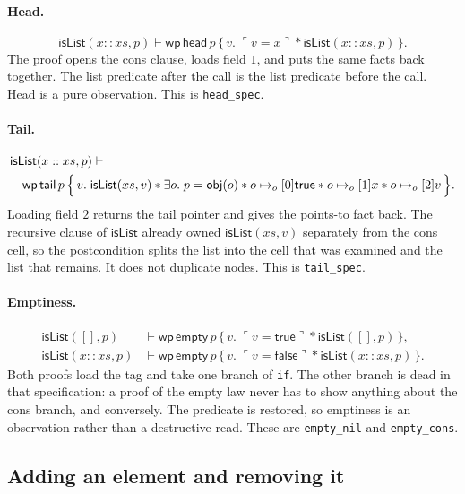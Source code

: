 \documentclass[11pt]{article}
\newcommand{\True}{\mathsf{true}}
\newcommand{\False}{\mathsf{false}}
\newcommand{\ptso}{\mathrel{\mapsto_{o}}}
\newcommand{\sep}{\mathbin{*}}
\newcommand{\Wpre}{\mathsf{wp}}
\newcommand{\pure}[1]{\ulcorner #1 \urcorner}
\begin{document}
\paragraph{Head.}
\[
\mathsf{isList}(x :: xs, p)
\vdash
\Wpre\,\mathsf{head}\,p
\,\{\,v.\; \pure{v = x} \sep \mathsf{isList}(x :: xs, p)\,\}.
\]
The proof opens the cons clause, loads field \(1\), and puts the same facts back together.
The list predicate after the call is the list predicate before the call.
Head is a pure observation.
This is \texttt{head\_spec}.

\paragraph{Tail.}
\[
\begin{aligned}
&\mathsf{isList}(x :: xs, p) \vdash {}\\
&\quad\Wpre\,\mathsf{tail}\,p
\,\Bigl\{\,v.\;
  \mathsf{isList}(xs, v)
  \sep
  \exists o.\;
  p = \mathsf{obj}(o)
  \sep
  o \ptso[0] \True
  \sep
  o \ptso[1] x
  \sep
  o \ptso[2] v
\,\Bigr\}.
\end{aligned}
\]
Loading field \(2\) returns the tail pointer and gives the points-to fact back.
The recursive clause of \(\mathsf{isList}\) already owned \(\mathsf{isList}(xs, v)\) separately from the cons cell, so the postcondition splits the list into the cell that was examined and the list that remains.
It does not duplicate nodes.
This is \texttt{tail\_spec}.

\paragraph{Emptiness.}
\[
\begin{aligned}
\mathsf{isList}([], p)
  &\vdash
  \Wpre\,\mathsf{empty}\,p
  \,\{\,v.\; \pure{v = \True} \sep \mathsf{isList}([], p)\,\},\\
\mathsf{isList}(x :: xs, p)
  &\vdash
  \Wpre\,\mathsf{empty}\,p
  \,\{\,v.\; \pure{v = \False} \sep \mathsf{isList}(x :: xs, p)\,\}.
\end{aligned}
\]
Both proofs load the tag and take one branch of \texttt{if}.
The other branch is dead in that specification: a proof of the empty law never has to show anything about the cons branch, and conversely.
The predicate is restored, so emptiness is an observation rather than a destructive read.
These are \texttt{empty\_nil} and \texttt{empty\_cons}.

\subsection{Adding an element and removing it}
\end{document}
